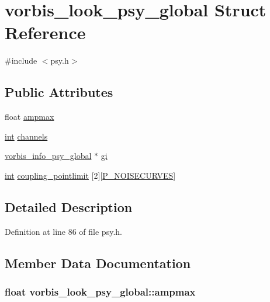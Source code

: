 \hypertarget{structvorbis__look__psy__global}{}\section{vorbis\+\_\+look\+\_\+psy\+\_\+global Struct Reference}
\label{structvorbis__look__psy__global}


{\ttfamily \#include $<$psy.\+h$>$}

\subsection*{Public Attributes}
\begin{DoxyCompactItemize}
\item 
float \hyperlink{structvorbis__look__psy__global_a973febd6d21b9ea9b20c601adfff77e0}{ampmax}
\item 
\hyperlink{xmltok_8h_a5a0d4a5641ce434f1d23533f2b2e6653}{int} \hyperlink{structvorbis__look__psy__global_ac86c7cc0a9c62a5271dd309e3607c9c0}{channels}
\item 
\hyperlink{structvorbis__info__psy__global}{vorbis\+\_\+info\+\_\+psy\+\_\+global} $\ast$ \hyperlink{structvorbis__look__psy__global_a03368bba0e885407073c7cadb7ebd45e}{gi}
\item 
\hyperlink{xmltok_8h_a5a0d4a5641ce434f1d23533f2b2e6653}{int} \hyperlink{structvorbis__look__psy__global_a71b674604d210e99d9d007f90d5e8ea6}{coupling\+\_\+pointlimit} \mbox{[}2\mbox{]}\mbox{[}\hyperlink{psy_8h_a179ea3e4fa2cdb1ef235e922ea51405a}{P\+\_\+\+N\+O\+I\+S\+E\+C\+U\+R\+V\+ES}\mbox{]}
\end{DoxyCompactItemize}


\subsection{Detailed Description}


Definition at line 86 of file psy.\+h.



\subsection{Member Data Documentation}
\subsubsection[{\texorpdfstring{ampmax}{ampmax}}]{\setlength{\rightskip}{0pt plus 5cm}float vorbis\+\_\+look\+\_\+psy\+\_\+global\+::ampmax}\hypertarget{structvorbis__look__psy__global_a973febd6d21b9ea9b20c601adfff77e0}{}\label{structvorbis__look__psy__global_a973febd6d21b9ea9b20c601adfff77e0}


